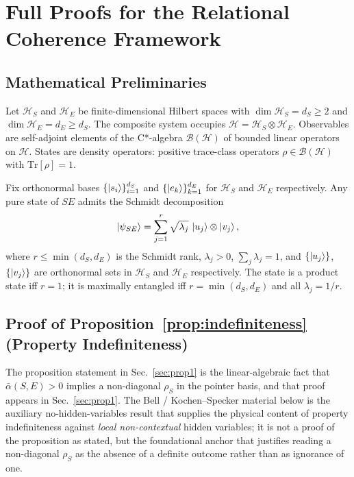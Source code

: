 
\section{Full Proofs for the Relational Coherence Framework}
\label{app:rct-proof}

\subsection{Mathematical Preliminaries}

Let $\mathcal{H}_S$ and $\mathcal{H}_E$ be finite-dimensional Hilbert spaces
with $\dim\mathcal{H}_S = d_S \geq 2$ and $\dim\mathcal{H}_E = d_E \geq d_S$.
The composite system occupies $\mathcal{H} = \mathcal{H}_S \otimes \mathcal{H}_E$.
Observables are self-adjoint elements of the C*-algebra
$\mathcal{B}(\mathcal{H})$ of bounded linear operators on $\mathcal{H}$.
States are density operators: positive trace-class operators
$\rho \in \mathcal{B}(\mathcal{H})$ with $\mathrm{Tr}[\rho] = 1$.

Fix orthonormal bases $\{\ket{s_i}\}_{i=1}^{d_S}$ and
$\{\ket{e_k}\}_{k=1}^{d_E}$ for $\mathcal{H}_S$ and $\mathcal{H}_E$
respectively.
Any pure state of $SE$ admits the Schmidt decomposition
\begin{equation}
  \ket{\psi_{SE}} = \sum_{j=1}^{r} \sqrt{\lambda_j}\,\ket{u_j}\otimes\ket{v_j},
  \label{eq:schmidt}
\end{equation}
where $r \leq \min(d_S, d_E)$ is the Schmidt rank, $\lambda_j > 0$,
$\sum_j \lambda_j = 1$, and $\{\ket{u_j}\}$, $\{\ket{v_j}\}$ are
orthonormal sets in $\mathcal{H}_S$ and $\mathcal{H}_E$ respectively.
The state is a product state iff $r = 1$; it is maximally entangled iff
$r = \min(d_S, d_E)$ and all $\lambda_j = 1/r$.

\subsection{Proof of Proposition~\ref{prop:indefiniteness} (Property Indefiniteness)}

The proposition statement in Sec.~\ref{sec:prop1} is the
linear-algebraic fact that $\bar\alpha(S,E)>0$ implies a non-diagonal
$\rho_S$ in the pointer basis, and that proof appears in
Sec.~\ref{sec:prop1}.
The Bell / Kochen--Specker material below is the auxiliary
no-hidden-variables result that supplies the physical content of
property indefiniteness against \emph{local non-contextual} hidden
variables; it is not a proof of the proposition as stated, but the
foundational anchor that justifies reading a non-diagonal $\rho_S$ as
the absence of a definite outcome rather than as ignorance of one.

